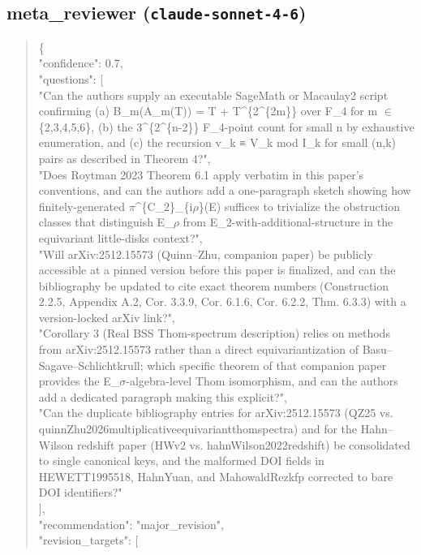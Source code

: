 \documentclass[11pt]{article}
\begin{document}
\subsection*{meta\_reviewer (\texttt{claude-sonnet-4-6})}
\begin{quote}\small\ttfamily\raggedright
\{\\
  "confidence": 0.7,\\
  "questions": [\\
    "Can the authors supply an executable SageMath or Macaulay2 script confirming (a) B\_m(A\_m(T)) = T + T\^{}\{2\^{}\{2m\}\} over F\_4 for m \ensuremath{\in} \{2,3,4,5,6\}, (b) the 3\^{}\{2\^{}\{n-2\}\} F\_4-point count for small n by exhaustive enumeration, and (c) the recursion v\_k ≡ V\_k mod I\_k for small (n,k) pairs as described in Theorem 4?",\\
    "Does Roytman 2023 Theorem 6.1 apply verbatim in this paper's conventions, and can the authors add a one-paragraph sketch showing how finitely-generated \ensuremath{\pi}\^{}\{C\_2\}\_\{i\ensuremath{\rho}\}(E) suffices to trivialize the obstruction classes that distinguish E\_\ensuremath{\rho} from E\_2-with-additional-structure in the equivariant little-disks context?",\\
    "Will arXiv:2512.15573 (Quinn--Zhu, companion paper) be publicly accessible at a pinned version before this paper is finalized, and can the bibliography be updated to cite exact theorem numbers (Construction 2.2.5, Appendix A.2, Cor. 3.3.9, Cor. 6.1.6, Cor. 6.2.2, Thm. 6.3.3) with a version-locked arXiv link?",\\
    "Corollary 3 (Real BSS Thom-spectrum description) relies on methods from arXiv:2512.15573 rather than a direct equivariantization of Basu--Sagave--Schlichtkrull; which specific theorem of that companion paper provides the E\_\ensuremath{\sigma}-algebra-level Thom isomorphism, and can the authors add a dedicated paragraph making this explicit?",\\
    "Can the duplicate bibliography entries for arXiv:2512.15573 (QZ25 vs. quinnZhu2026multiplicativeequivariantthomspectra) and for the Hahn--Wilson redshift paper (HWv2 vs. hahnWilson2022redshift) be consolidated to single canonical keys, and the malformed DOI fields in HEWETT1995518, HahnYuan, and MahowaldRezkfp corrected to bare DOI identifiers?"\\
  ],\\
  "recommendation": "major\_revision",\\
  "revision\_targets": [\\

\end{quote}
\end{document}
